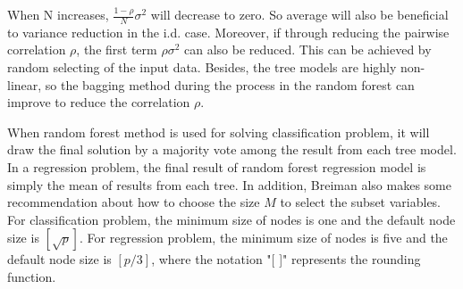 When N increases,  $\frac{1-\rho}{N}\sigma^2$ will decrease to zero. So average will also be beneficial to variance reduction in the i.d. case.  Moreover,  if through reducing the pairwise correlation $\rho$,  the first term $\rho\sigma^2$ can also be reduced. This can be achieved by random selecting of the input data. Besides, the tree models are highly non-linear,  so the bagging method during the process in the random forest  can improve to reduce the correlation $\rho$.  

When random forest method is used for solving classification problem,  it will draw the final solution by a majority vote among the result from each tree model. In a regression problem,  the final result of random forest regression model is simply the mean of results from each tree. In addition,  Breiman also makes some recommendation about how to choose the size $M$ to select the subset variables. For classification problem,  the minimum size of nodes is one and the default node size is $[\sqrt{p}]$. For regression problem,  the minimum size of nodes is five and the default node size is $[p/3]$,  where the notation "[ ]" represents the rounding function.